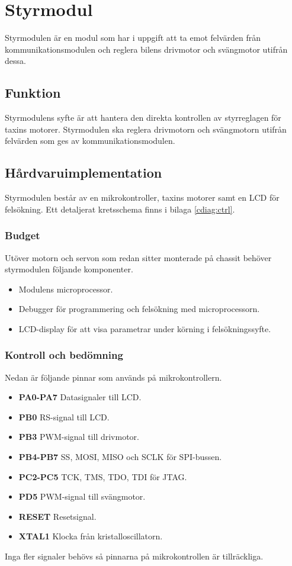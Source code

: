 \documentclass[designspec/spec.tex]{subfiles}
\begin{document}
\section{Styrmodul}
Styrmodulen är en modul som har i uppgift att ta emot felvärden från
kommunikationsmodulen och reglera bilens drivmotor och svängmotor utifrån
dessa.

\subsection{Funktion}
Styrmodulens syfte är att hantera den direkta kontrollen av styrreglagen för
taxins motorer. Styrmodulen ska reglera drivmotorn och svängmotorn utifrån
felvärden som ges av kommunikationsmodulen.

\subsection{Hårdvaruimplementation}
Styrmodulen består av en mikrokontroller, taxins motorer samt en LCD för
felsökning. Ett detaljerat kretsschema finns i bilaga \ref{cdiag:ctrl}.

\subsubsection{Budget}
Utöver motorn och servon som redan sitter monterade på chassit behöver
styrmodulen följande komponenter.
\begin{itemize}
	\item \textbf{\modMicrocontroller} Modulens microprocessor. 
    \item \textbf{\modJtag} Debugger för programmering och felsökning med
        microprocessorn. 
    \item \textbf{\modLcd} LCD-display för att visa parametrar under körning i
        felsökningssyfte.
\end{itemize}

\subsubsection{Kontroll och bedömning}
Nedan är följande pinnar som används på mikrokontrollern.
\begin{itemize}
   \item \textbf{PA0-PA7} Datasignaler till LCD.
   \item \textbf{PB0} RS-signal till LCD.
   \item \textbf{PB3} PWM-signal till drivmotor.
   \item \textbf{PB4-PB7} SS, MOSI, MISO och SCLK för SPI-bussen.
   \item \textbf{PC2-PC5} TCK, TMS, TDO, TDI för JTAG.
   \item \textbf{PD5} PWM-signal till svängmotor.
   \item \textbf{RESET} Resetsignal.
   \item \textbf{XTAL1} Klocka från kristalloscillatorn.
\end{itemize}
Inga fler signaler behövs så pinnarna på mikrokontrollen är tillräckliga.
\end{document}
